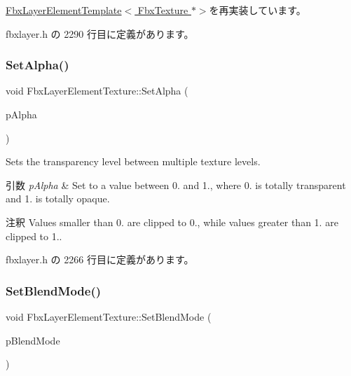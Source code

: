 \hyperlink{class_fbx_layer_element_template_aa6a7b5ed38b51d4a903f9ed2e715ee79}{Fbx\+Layer\+Element\+Template$<$ Fbx\+Texture $\ast$$>$}を再実装しています。



 fbxlayer.\+h の 2290 行目に定義があります。

\mbox{\label{class_fbx_layer_element_texture_a775988b21edfe6a084e306d5f67fd1e8}} 
\subsubsection{\texorpdfstring{Set\+Alpha()}{SetAlpha()}}
{\footnotesize\ttfamily void Fbx\+Layer\+Element\+Texture\+::\+Set\+Alpha (\begin{DoxyParamCaption}\item[{double}]{p\+Alpha }\end{DoxyParamCaption})\hspace{0.3cm}{\ttfamily [inline]}}

Sets the transparency level between multiple texture levels. 
\begin{DoxyParams}{引数}
{\em p\+Alpha} & Set to a value between 0. and 1., where 0. is totally transparent and 1. is totally opaque. \\
\hline
\end{DoxyParams}
\begin{DoxyRemark}{注釈}
Values smaller than 0. are clipped to 0., while values greater than 1. are clipped to 1.. 
\end{DoxyRemark}


 fbxlayer.\+h の 2266 行目に定義があります。

\mbox{\label{class_fbx_layer_element_texture_ac10e1c4ab20077c963b8d097f867ee53}} 
\subsubsection{\texorpdfstring{Set\+Blend\+Mode()}{SetBlendMode()}}
{\footnotesize\ttfamily void Fbx\+Layer\+Element\+Texture\+::\+Set\+Blend\+Mode (\begin{DoxyParamCaption}\item[{\hyperlink{class_fbx_layer_element_texture_a95d9277da243733eae14d4d0141f77ea}{E\+Blend\+Mode}}]{p\+Blend\+Mode }\end{DoxyParamCaption})\hspace{0.3cm}{\ttfamily [inline]}}

